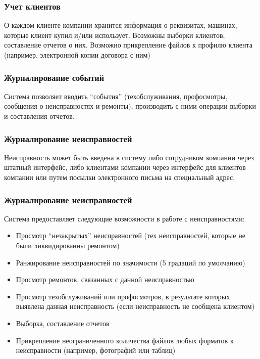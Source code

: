 \documentclass{beamer}
\begin{document}
\begin{frame}
\frametitle{Учет клиентов}
	О каждом клиенте компании хранится информация о реквизитах, машинах, которые
	клиент купил и/или использует. Возможны выборки клиентов, составление отчетов
	о них.
	Возможно прикрепление файлов к профилю клиента (например, электронной копии
	договора с ним)
\end{frame}

\begin{frame}
\frametitle{Журналирование событий}
	Система позволяет вводить ``события'' (техобслуживания, профосмотры, сообщения
	о неисправностях и ремонты), производить с ними операции выборки и составления
	отчетов.
\end{frame}

\begin{frame}
\frametitle{Журналирование неисправностей}
	Неисправность может быть введена в систему либо сотрудником компании через
	штатный интерфейс, либо клиентами компании через интерфейс для клиентов
	компании или путем посылки электронного письма на специальный адрес.

\end{frame}

\begin{frame}
\frametitle{Журналирование неисправностей}

	Система предоставляет следующие возможности в работе с неисправностями:
	\begin{itemize}
	  \item Просмотр ``незакрытых'' неисправностей (тех неисправностей, которые не
	  были ликвидированны ремонтом)
	  \item Ранжирование неисправностей по значимости (5 градаций по умолчанию)
	  \item Просмотр ремонтов, связанных с данной неисправностью
	  \item Просмотр техобслуживаний или профосмотров, в результате которых
	  выявлена данная неисправность (если неисправность не сообщена клиентом)
	  \item Выборка, составление отчетов
	  \item Прикрепление неограниченного количества файлов любых форматов к
	  неисправности (например, фотографий или таблиц)
	\end{itemize}
\end{frame}
\end{document}
